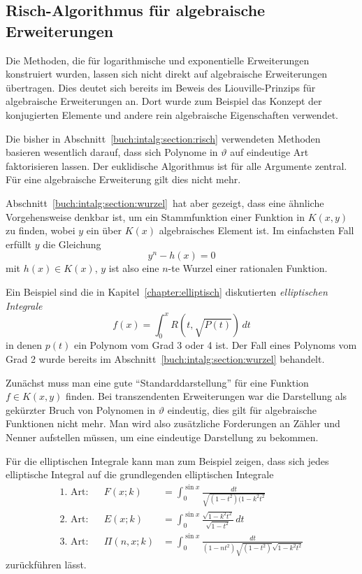 %
%
\subsection{Risch-Algorithmus für algebraische Erweiterungen
\label{buch:intalg:risch:algebraisch}}
Die Methoden, die für logarithmische und exponentielle Erweiterungen
konstruiert wurden, lassen sich nicht direkt auf algebraische
Erweiterungen übertragen.
Dies deutet sich bereits im Beweis des Liouville-Prinzips für algebraische
Erweiterungen an.
Dort wurde zum Beispiel das Konzept der konjugierten Elemente und andere
rein algebraische Eigenschaften verwendet.

Die bisher in Abschnitt~\ref{buch:intalg:section:risch} verwendeten
Methoden basieren wesentlich darauf, dass sich Polynome in $\vartheta$
auf eindeutige Art faktorisieren lassen.
Der euklidische Algorithmus ist für alle Argumente zentral.
Für eine algebraische Erweiterung gilt dies nicht mehr.

Abschnitt~\ref{buch:intalg:section:wurzel} hat aber gezeigt, dass
eine ähnliche Vorgehensweise denkbar ist, um ein Stammfunktion
einer Funktion in $K(x,y)$ zu finden, wobei $y$ ein über $K(x)$
algebraisches Element ist.
Im einfachsten Fall erfüllt $y$ die Gleichung
\[
y^n - h(x) = 0
\]
mit $h(x) \in K(x)$, $y$ ist also eine $n$-te Wurzel einer rationalen
Funktion.

Ein Beispiel sind die in Kapitel~\ref{chapter:elliptisch} diskutierten
\emph{elliptischen Integrale}
%
\[
f(x) = \int_0^x R(t,\!\sqrt{P(t)})\,dt
\]
in denen $p(t)$ ein Polynom vom Grad 3 oder 4 ist.
Der Fall eines Polynoms vom Grad 2 wurde bereits im
Abschnitt~\ref{buch:intalg:section:wurzel} behandelt.

Zunächst muss man eine gute ``Standarddarstellung'' für eine Funktion
$f\in K(x,y)$ finden.
Bei transzendenten Erweiterungen war die Darstellung als gekürzter Bruch
von Polynomen in $\vartheta$ eindeutig, dies gilt für algebraische
Funktionen nicht mehr.
Man wird also zusätzliche Forderungen an Zähler und Nenner aufstellen
müssen, um eine eindeutige Darstellung zu bekommen.

Für die elliptischen Integrale kann man zum Beispiel zeigen, dass sich
jedes elliptische Integral auf die grundlegenden elliptischen Integrale
\begin{align*}
\text{1.~Art:}&&
F(x;k)
&=
\int_0^{\sin x} \frac{dt}{\!\sqrt{(1-t^2)(1-k^2t^2}}
\\
\text{2.~Art:}&&
E(x;k)
&=
\int_0^{\sin x} \frac{\!\sqrt{1-k^2t^2}}{\!\sqrt{1-t^2}}\,dt
\\[5pt]
\text{3.~Art:}&&
\Pi(n,x;k)
&=
\int_0^{\sin x}\frac{dt}{(1-nt^2)\!\sqrt{(1-t^2)}\!\sqrt{1-k^2t^2}}
\end{align*}
zurückführen lässt.

